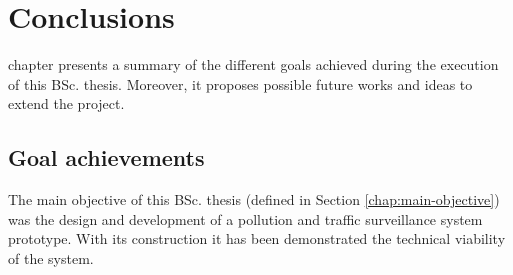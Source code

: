 \chapter{Conclusions}
\label{chap:conclusions} 

 chapter presents a summary of the different goals achieved during the execution of this \ac{BSc.} thesis. Moreover, it proposes possible future works and ideas to extend the project.


\section{Goal achievements}

The main objective of this \ac{BSc.} thesis (defined in Section \ref{chap:main-objective}) was the design and development of a pollution and traffic surveillance system prototype. With its construction it has been demonstrated the technical viability of the system.

